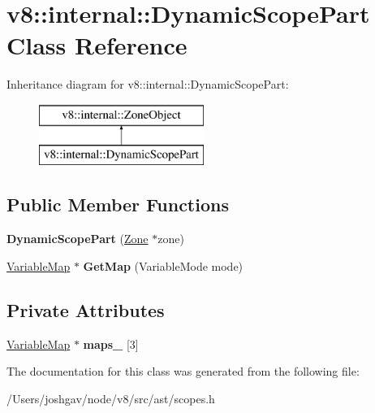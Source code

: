 \hypertarget{classv8_1_1internal_1_1_dynamic_scope_part}{}\section{v8\+:\+:internal\+:\+:Dynamic\+Scope\+Part Class Reference}
\label{classv8_1_1internal_1_1_dynamic_scope_part}
Inheritance diagram for v8\+:\+:internal\+:\+:Dynamic\+Scope\+Part\+:\begin{figure}[H]
\begin{center}
\leavevmode
\includegraphics[height=2.000000cm]{classv8_1_1internal_1_1_dynamic_scope_part}
\end{center}
\end{figure}
\subsection*{Public Member Functions}
\begin{DoxyCompactItemize}
\item 
{\bfseries Dynamic\+Scope\+Part} (\hyperlink{classv8_1_1internal_1_1_zone}{Zone} $\ast$zone)\hypertarget{classv8_1_1internal_1_1_dynamic_scope_part_a3c5113ac321bc9169b56cb20ad8d5f13}{}\label{classv8_1_1internal_1_1_dynamic_scope_part_a3c5113ac321bc9169b56cb20ad8d5f13}

\item 
\hyperlink{classv8_1_1internal_1_1_variable_map}{Variable\+Map} $\ast$ {\bfseries Get\+Map} (Variable\+Mode mode)\hypertarget{classv8_1_1internal_1_1_dynamic_scope_part_ac1b3bda0729b6d8e3443442557465b85}{}\label{classv8_1_1internal_1_1_dynamic_scope_part_ac1b3bda0729b6d8e3443442557465b85}

\end{DoxyCompactItemize}
\subsection*{Private Attributes}
\begin{DoxyCompactItemize}
\item 
\hyperlink{classv8_1_1internal_1_1_variable_map}{Variable\+Map} $\ast$ {\bfseries maps\+\_\+} \mbox{[}3\mbox{]}\hypertarget{classv8_1_1internal_1_1_dynamic_scope_part_aaaa3f272f32084e284a775f2624b9b0c}{}\label{classv8_1_1internal_1_1_dynamic_scope_part_aaaa3f272f32084e284a775f2624b9b0c}

\end{DoxyCompactItemize}


The documentation for this class was generated from the following file\+:\begin{DoxyCompactItemize}
\item 
/\+Users/joshgav/node/v8/src/ast/scopes.\+h\end{DoxyCompactItemize}
